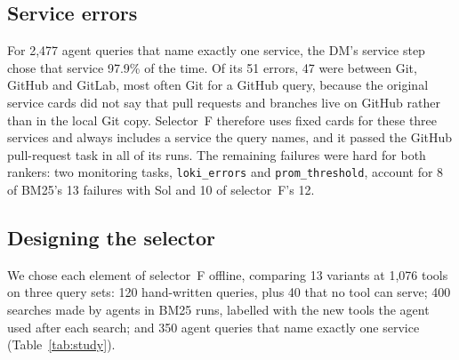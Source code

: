 \documentclass[11pt]{article}
\newcommand{\F}{selector~F}
\begin{document}
\subsection{Service errors}\label{sec:failures}
For 2{,}477 agent queries that name exactly one service, the DM's service step chose that service 97.9\% of the time.
Of its 51 errors, 47 were between Git, GitHub and GitLab, most often Git for a GitHub query, because the original
service cards did not say that pull requests and branches live on GitHub rather than in the local Git copy. Selector~F
therefore uses fixed cards for these three services and always includes a service the query names, and it passed the
GitHub pull-request task in all of its runs. The remaining failures were hard for both rankers: two monitoring tasks,
\texttt{loki\_errors} and \texttt{prom\_threshold}, account for 8 of BM25's 13 failures with Sol and 10 of \F{}'s 12.

\subsection{Designing the selector}\label{sec:study}
We chose each element of \F{} offline, comparing 13 variants at 1{,}076 tools on three query sets: 120 hand-written
queries, plus 40 that no tool can serve; 400 searches made by agents in BM25 runs, labelled with the new tools the agent
used after each search; and 350 agent queries that name exactly one service (Table~\ref{tab:study}).
\end{document}
